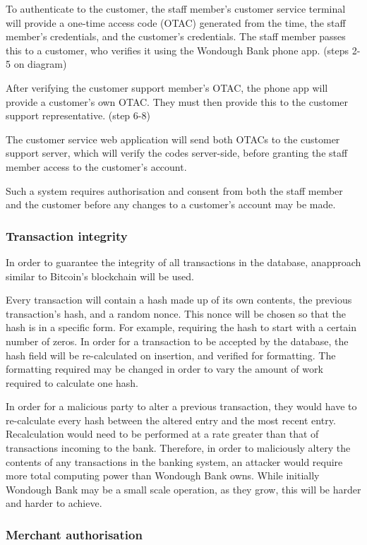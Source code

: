 To authenticate to the customer, the staff member's customer service terminal will provide a one-time access code (OTAC) generated from the time, the staff member's credentials, and the customer's credentials. The staff member passes this to a customer, who verifies it using the Wondough Bank phone app. (steps 2-5 on diagram)

After verifying the customer support member's OTAC, the phone app will provide a customer's own OTAC. They must then provide this to the customer support representative. (step 6-8)

The customer service web application will send both OTACs to the customer support server, which will verify the codes server-side, before granting the staff member access to the customer's account.

Such a system requires authorisation and consent from both the staff member and the customer before any changes to a customer's account may be made.

\subsubsection{Transaction integrity}

In order to guarantee the integrity of all transactions in the database, anapproach similar to Bitcoin's blockchain \cite{blockchain} will be used.

Every transaction will contain a hash made up of its own contents, the previous transaction's hash, and a random nonce. This nonce will be chosen so that the hash is in a specific form. For example, requiring the hash to start with a certain number of zeros. In order for a transaction to be accepted by the database, the hash field will be re-calculated on insertion, and verified for formatting. The formatting required may be changed in order to vary the amount of work required to calculate one hash.

In order for a malicious party to alter a previous transaction, they would have to re-calculate every hash between the altered entry and the most recent entry. Recalculation would need to be performed at a rate greater than that of transactions incoming to the bank. Therefore, in order to maliciously altery the contents of any transactions in the banking system, an attacker would require more total computing power than Wondough Bank owns. While initially Wondough Bank may be a small scale operation, as they grow, this will be harder and harder to achieve.

\subsubsection{Merchant authorisation}

